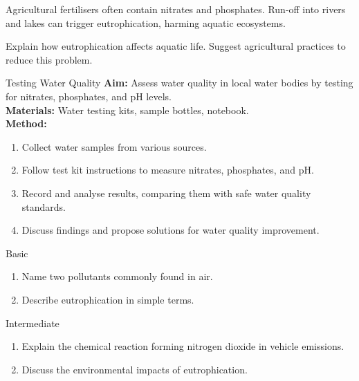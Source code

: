 
\begin{example}
Agricultural fertilisers often contain nitrates and phosphates. Run-off into rivers and lakes can trigger eutrophication, harming aquatic ecosystems.
\end{example}

\begin{stopandthink}
Explain how eutrophication affects aquatic life. Suggest agricultural practices to reduce this problem.
\end{stopandthink}

\begin{investigation}{Testing Water Quality}
\textbf{Aim:} Assess water quality in local water bodies by testing for nitrates, phosphates, and pH levels.\\
\textbf{Materials:} Water testing kits, sample bottles, notebook.\\
\textbf{Method:}
\begin{enumerate}
\item Collect water samples from various sources.
\item Follow test kit instructions to measure nitrates, phosphates, and pH.
\item Record and analyse results, comparing them with safe water quality standards.
\item Discuss findings and propose solutions for water quality improvement.
\end{enumerate}
\end{investigation}

\begin{tieredquestions}{Basic}
\begin{enumerate}
\item Name two pollutants commonly found in air.
\item Describe eutrophication in simple terms.
\end{enumerate}
\end{tieredquestions}

\begin{tieredquestions}{Intermediate}
\begin{enumerate}
\item Explain the chemical reaction forming nitrogen dioxide in vehicle emissions.
\item Discuss the environmental impacts of eutrophication.
\end{enumerate}
\end{tieredquestions}


